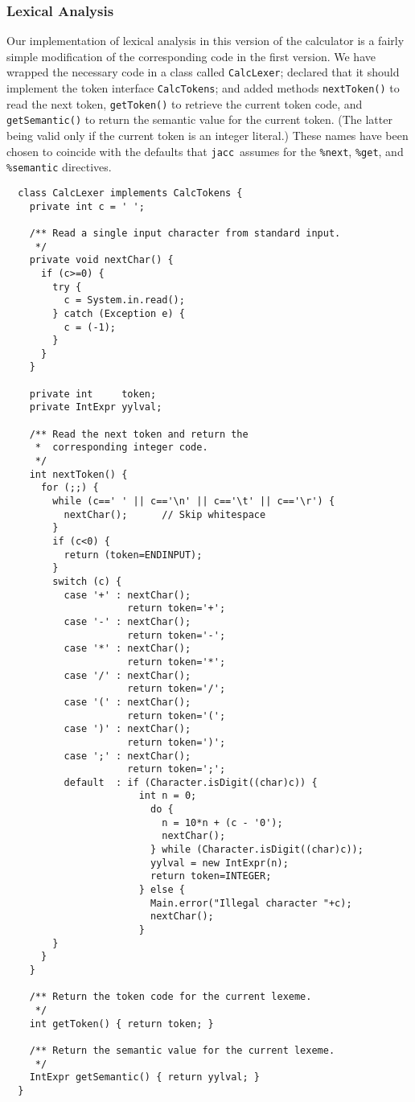 \documentclass[12pt]{article}
\def\jacc{{\tt jacc}}
\begin{document}
\subsubsection{Lexical Analysis}
Our implementation of lexical analysis in this version of the calculator
is a fairly simple modification of the corresponding code in the first
version.  We have wrapped the necessary code in a class
called \verb"CalcLexer"; declared that it should implement the token
interface \verb"CalcTokens"; and added methods \verb"nextToken()" to
read the next token, \verb"getToken()" to retrieve the current token
code, and \verb"getSemantic()" to return the semantic value for the
current token.  (The latter being valid only if the current token is
an integer literal.)  These names have been chosen to coincide with
the defaults that \jacc\ assumes for the \verb"%next", \verb"%get",
and \verb"%semantic" directives.
{\small
\begin{verbatim}
  class CalcLexer implements CalcTokens {
    private int c = ' ';

    /** Read a single input character from standard input.
     */
    private void nextChar() {
      if (c>=0) {
        try {
          c = System.in.read();
        } catch (Exception e) {
          c = (-1);
        }
      }
    }

    private int     token;
    private IntExpr yylval;

    /** Read the next token and return the
     *  corresponding integer code.
     */
    int nextToken() {
      for (;;) {
        while (c==' ' || c=='\n' || c=='\t' || c=='\r') {
          nextChar();      // Skip whitespace
        }
        if (c<0) {
          return (token=ENDINPUT);
        }
        switch (c) {
          case '+' : nextChar();
                     return token='+';
          case '-' : nextChar();
                     return token='-';
          case '*' : nextChar();
                     return token='*';
          case '/' : nextChar();
                     return token='/';
          case '(' : nextChar();
                     return token='(';
          case ')' : nextChar();
                     return token=')';
          case ';' : nextChar();
                     return token=';';
          default  : if (Character.isDigit((char)c)) {
                       int n = 0;
                         do {
                           n = 10*n + (c - '0');
                           nextChar();
                         } while (Character.isDigit((char)c));
                         yylval = new IntExpr(n);
                         return token=INTEGER;
                       } else {
                         Main.error("Illegal character "+c);
                         nextChar();
                       }
        }
      }
    }

    /** Return the token code for the current lexeme.
     */
    int getToken() { return token; }

    /** Return the semantic value for the current lexeme.
     */
    IntExpr getSemantic() { return yylval; }
  }
\end{verbatim}
}%
\end{document}
